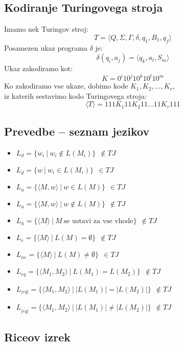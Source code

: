 \documentclass[a4paper]{article}
\begin{document}
\begin{multicols}{2}

\subsection*{Kodiranje Turingovega stroja}
Imamo nek Turingov stroj: \[T=\langle Q,\Sigma,\Gamma,\delta,q_1,B_1,q_f \rangle \]
Posamezen ukaz programa $\delta$ je: \[ \delta(q_i,a_j)=\langle q_k, a_l, S_m \rangle \]
Ukaz zakodiramo kot: \[ K=0^i 1 0^j 1 0^k 1 0^l 1 0^m \]
Ko zakodiramo vse ukaze, dobimo kode $K_1, K_2, \dots, K_r$,\\ iz katerih sestavimo kodo Turingovega stroja:
	\[ \langle T \rangle = 111 K_1 11 K_2 11 \dots 11 K_r 111\]

\subsection*{Prevedbe -- seznam jezikov}
\begin{itemize}
\item $L_d = \lbrace w_i \ | \ w_i \not\in L(M_i) \rbrace \ \ \not\in TJ $ 
\item $L_{\overline{d}} = \lbrace w \ | \ w_i \in L(M_i) \rbrace \ \ \in TJ $ 
\item $L_u = \lbrace \langle M,w \rangle \ | \ w \in L(M) \rbrace \ \ \in TJ $ 
\item $L_{\overline{u}} = \lbrace \langle M,w \rangle \ | \ w \not\in L(M) \rbrace \ \ \not\in TJ $ 
\item $L_h = \lbrace \langle M \rangle \ | \ M \ \text{se ustavi za vse vhode} \rbrace \ \ \not\in TJ $ 
\item $L_e = \lbrace \langle M \rangle \ | \ L(M) = \emptyset \rbrace \ \ \not\in TJ $ 
\item $L_{ne} = \lbrace \langle M \rangle \ | \ L(M) \neq \emptyset \rbrace \ \ \in TJ $ 
\item $L_{eq} = \lbrace \langle M_1,M_2 \rangle \ | \ L(M_1) = L(M_2) \rbrace \ \ \not\in TJ $ 
\item $L_{|eq|} = \lbrace \langle M_1,M_2 \rangle \ | \ |L(M_1)| = |L(M_2)| \rbrace \ \ \not\in TJ $ 
\item $L_{ \overline{ |eq|}} = \lbrace \langle M_1,M_2 \rangle \ | \ |L(M_1)| \neq |L(M_2)| \rbrace \ \ \not\in TJ $ 
\end{itemize}

\subsection*{Riceov izrek}


\end{multicols}
\end{document}
